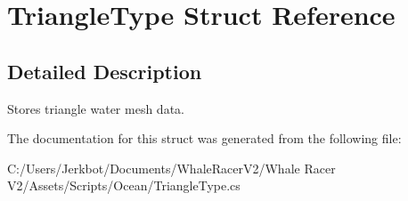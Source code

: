 \hypertarget{struct_triangle_type}{}\section{Triangle\+Type Struct Reference}
\label{struct_triangle_type}


\subsection{Detailed Description}
Stores triangle water mesh data. 



The documentation for this struct was generated from the following file\+:\begin{DoxyCompactItemize}
\item 
C\+:/\+Users/\+Jerkbot/\+Documents/\+Whale\+Racer\+V2/\+Whale Racer V2/\+Assets/\+Scripts/\+Ocean/Triangle\+Type.\+cs\end{DoxyCompactItemize}
